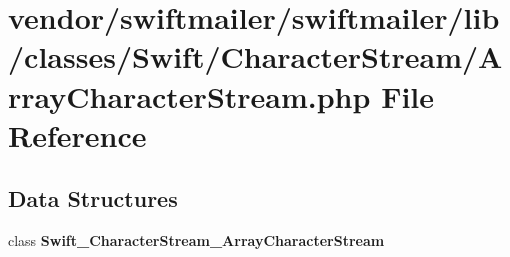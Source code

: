 \section{vendor/swiftmailer/swiftmailer/lib/classes/\+Swift/\+Character\+Stream/\+Array\+Character\+Stream.php File Reference}
\label{_array_character_stream_8php}
\subsection*{Data Structures}
\begin{DoxyCompactItemize}
\item 
class {\bf Swift\+\_\+\+Character\+Stream\+\_\+\+Array\+Character\+Stream}
\end{DoxyCompactItemize}
